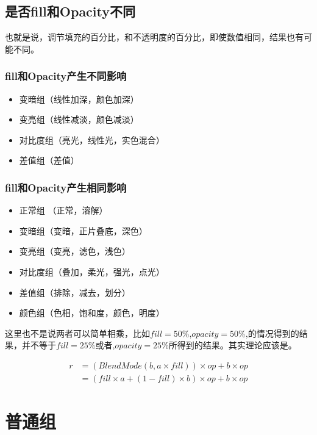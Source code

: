 \section{ 是否fill和Opacity不同}

 也就是说，调节填充的百分比，和不透明度的百分比，即使数值相同，结果也有可能不同。
\subsection{ fill和Opacity产生不同影响}
\begin{itemize}
	\item 变暗组（线性加深，颜色加深）
	\item 变亮组（线性减淡，颜色减淡）
	\item 对比度组（亮光，线性光，实色混合）
	\item 差值组（差值）
\end{itemize}
\subsection{ fill和Opacity产生相同影响}
\begin{itemize}
	\item 正常组 （正常，溶解）
	\item 变暗组（变暗，正片叠底，深色）
	\item 变亮组（变亮，滤色，浅色）
	\item 对比度组（叠加，柔光，强光，点光）
	\item 差值组（排除，减去，划分）
	\item 颜色组（色相，饱和度，颜色，明度）
\end{itemize}
\begin{notice}
	\item 这里也不是说两者可以简单相乘，比如$fill=50\%$,$opacity=50\%$,的情况得到的结果，并不等于$fill=25\%$或者,$opacity=25\%$所得到的结果。其实理论应该是。
 \item	\begin{equation}
		\begin{aligned}
			r&=(BlendMode(b,a\times fill))\times op+b\times op\\&=(fill\times a+(1-fill)\times b)\times op+b\times op
		\end{aligned}
	\end{equation}
\end{notice}

\chapter{普通组}

